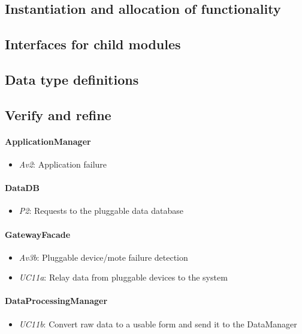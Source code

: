 \documentclass[english]{sareport}
\begin{document}
\subsection{Instantiation and allocation of functionality}
\subsection{Interfaces for child modules}
\subsection{Data type definitions}
\subsection{Verify and refine}

\paragraph{ApplicationManager}
\begin{itemize}
	\item \emph{Av2}: Application failure
\end{itemize}

\paragraph{DataDB}
\begin{itemize}
	\item \emph{P2}: Requests to the pluggable data database
\end{itemize}

\paragraph{GatewayFacade}
\begin{itemize}
	\item \emph{Av3b}: Pluggable device/mote failure detection
	\item \emph{UC11a}: Relay data from pluggable devices to the system
\end{itemize}

\paragraph{DataProcessingManager}
\begin{itemize}
	\item \emph{UC11b}: Convert raw data to a usable form and send it to the DataManager
\end{itemize}
\end{document}
